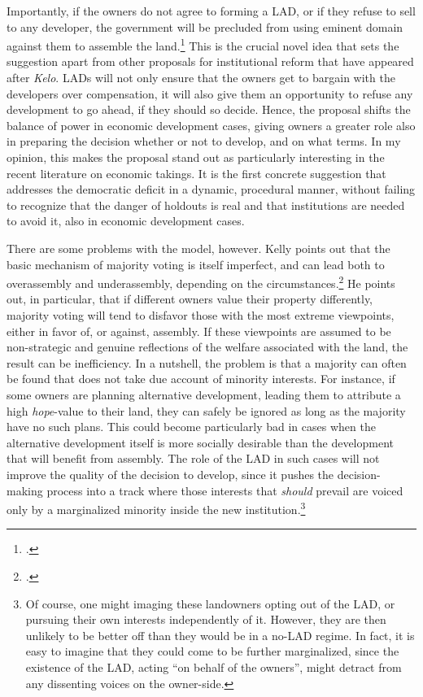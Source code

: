 \documentclass[12pt,a4paper]{book} %
\begin{document}
Importantly, if the owners do not agree to forming a LAD, or if they refuse to sell to any developer, the government will be precluded from using eminent domain against them to assemble the land.\footcite[1491]{heller08} This is the crucial novel idea that sets the suggestion apart from other proposals for institutional reform that have appeared after {\it Kelo}. LADs will not only ensure that the owners get to bargain with the developers over compensation, it will also give them an opportunity to refuse any development to go ahead, if they should so decide. Hence, the proposal shifts the balance of power in economic development cases, giving owners a greater role also in preparing the decision whether or not to develop, and on what terms. In my opinion, this makes the proposal stand out as particularly interesting in the recent literature on economic takings. It is the first concrete suggestion that addresses the democratic deficit in a dynamic, procedural manner, without failing to recognize that the danger of holdouts is real and that institutions are needed to avoid it, also in economic development cases.

There are some problems with the model, however. Kelly points out that the basic mechanism of majority voting is itself imperfect, and can lead both to overassembly and underassembly, depending on the circumstances.\footcite{kelly09} He points out, in particular, that if different owners value their property differently, majority voting will tend to disfavor those with the most extreme viewpoints, either in favor of, or against, assembly. If these viewpoints are assumed to be non-strategic and genuine reflections of the welfare associated with the land, the result can be inefficiency. In a nutshell, the problem is that a majority can often be found that does not take due account of minority interests. For instance, if some owners are planning alternative development, leading them to attribute a high {\it hope}-value to their land, they can safely be ignored as long as the majority have no such plans. This could become particularly bad in cases when the alternative development itself is more socially desirable than the development that will benefit from assembly. The role of the LAD in such cases will not improve the quality of the decision to develop, since it pushes the decision-making process into a track where those interests that {\it should} prevail are voiced only by a marginalized minority inside the new institution.\footnote{Of course, one might imaging these landowners opting out of the LAD, or pursuing their own interests independently of it. However, they are then unlikely to be better off than they would be in a no-LAD regime. In fact, it is easy to imagine that they could come to be further marginalized, since the existence of the LAD, acting ``on behalf of the owners'', might detract from any dissenting voices on the owner-side.}
\end{document}
